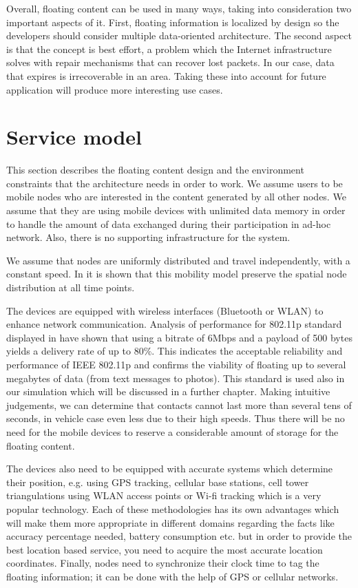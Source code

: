 Overall, floating content can be used in many ways, taking into consideration
two important aspects of it. First, floating information is localized by design
so the developers should consider multiple data-oriented architecture.
The second aspect is that the concept is best effort, a problem which
the Internet infrastructure solves with repair mechanisms that can recover lost
packets. In our case, data that expires is irrecoverable in an area. Taking
these into account for future application will produce more interesting use
cases.

\section{Service model}

This section describes the floating content design and the environment
constraints that the architecture needs in order to work. We assume users to be
mobile nodes who are interested in the content generated by all other nodes. We
assume that they are using mobile devices with unlimited data memory in order to
handle the amount of data exchanged during their participation in ad-hoc
network. Also, there is no supporting infrastructure for the system.

We assume that nodes are uniformly distributed and travel independently, with a
constant speed. In \cite{uniform_distribution} it is shown that this mobility
model preserve the spatial node distribution at all time points.

The devices are equipped with wireless interfaces (Bluetooth or WLAN) to enhance
network communication. Analysis of performance for 802.11p standard displayed in
\cite {performance80211} have shown that using a bitrate of 6Mbps and a
payload of 500 bytes yields a delivery rate of up to 80\%. This indicates the
acceptable reliability and performance of IEEE 802.11p and confirms the
viability of floating up to several megabytes of data (from text messages to
photos). This standard is used also in our simulation which will be discussed in
a further chapter. Making intuitive judgements, we can determine that contacts
cannot last more than several tens of seconds, in vehicle case even less due to
their high speeds. Thus there will be no need for the mobile devices to reserve
a considerable amount of storage for the floating content.

The devices also need to be equipped with accurate systems which determine their
position, e.g. using GPS tracking, cellular base stations, cell tower
triangulations using WLAN access points or Wi-fi tracking which is a very
popular technology. Each of these methodologies has its own advantages which
will make them more appropriate in different domains regarding the facts like
accuracy percentage needed, battery consumption etc. but in order to provide the
best location based service, you need to acquire the most accurate location
coordinates. Finally, nodes need to synchronize their clock time to tag the
floating information; it can be done with the help of GPS or cellular networks.

